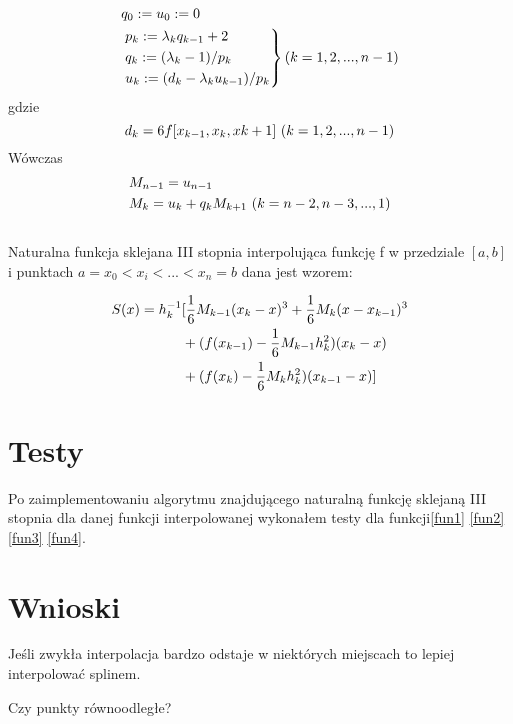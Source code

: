 \documentclass{article}
\begin{document}
\begin{align}
	&q_0 := u_0 := 0 \\
	\notag
	&\begin{rcases}
		p_k := \lambda_k q_{k-1} + 2 \\ \notag
		q_k := (\lambda_k - 1) / p_k \\ \notag
		u_k := (d_k -\lambda_k u_{k-1}) / p_k
	\end{rcases}
	\text{$(k=1,2,...,n-1)$}
\end{align}
gdzie
\begin{equation*}
	d_k = 6 f[x_{k-1},x_k,x{k+1}] \textnormal{ } (k=1,2,...,n-1)
\end{equation*}
Wówczas
\begin{align*}
	&M_{n-1} = u_{n-1} \\ \notag
	&M_k = u_k + q_k M_{k+1} \textnormal{ } (k =n-2,n-3,...,1 )
\end{align*}
\\

\noindent Naturalna funkcja sklejana III stopnia interpolująca funkcję f w przedziale $[a,b]$ i punktach $a = x_0 < x_i <...<x_n = b$ dana jest wzorem:

\begin{align}
	S(x) = h_{k}^{-1}&[\frac{1}{6} M_{k-1}(x_k - x)^3  
					 +\frac{1}{6} M_k (x - x_{k-1})^3 \\
					 \notag
					 &+(f(x_{k-1}) - \frac{1}{6} M_{k-1} h_{k}^2) (x_k -x ) \\
					 \notag
					 &+(f(x_{k}) - \frac{1}{6} M_{k} h_{k}^2) (x_{k-1} -x )]
\end{align}


\section{Testy}
Po zaimplementowaniu algorytmu znajdującego naturalną funkcję sklejaną III stopnia dla danej funkcji interpolowanej wykonałem testy dla funkcji\eqref{fun1} \eqref{fun2} \eqref{fun3} \eqref{fun4}.
	
	
\section{Wnioski}
Jeśli zwykła interpolacja bardzo odstaje w niektórych miejscach to lepiej interpolować splinem.

Czy punkty równoodległe?
\end{document}
